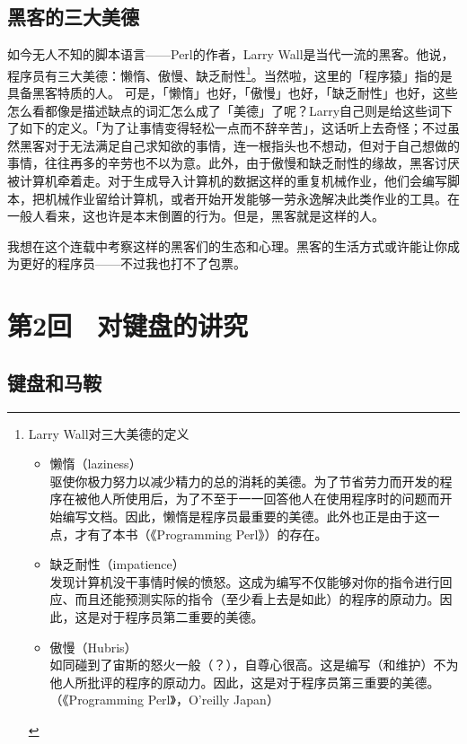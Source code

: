 \documentclass[a4paper,12pt]{article}
\begin{document}
\subsection{黑客的三大美德}
如今无人不知的脚本语言——Perl的作者，Larry Wall是当代一流的黑客。他说，程序员有三大美德：懒惰、傲慢、缺乏耐性\footnote{Larry Wall对三大美德的定义

\begin{itemize}
\item 懒惰（laziness）\\ 
驱使你极力努力以减少精力的总的消耗的美德。为了节省劳力而开发的程序在被他人所使用后，为了不至于一一回答他人在使用程序时的问题而开始编写文档。因此，懒惰是程序员最重要的美德。此外也正是由于这一点，才有了本书（《Programming Perl》）的存在。

\item 缺乏耐性（impatience）\\ 
发现计算机没干事情时候的愤怒。这成为编写不仅能够对你的指令进行回应、而且还能预测实际的指令（至少看上去是如此）的程序的原动力。因此，这是对于程序员第二重要的美德。

\item 傲慢（Hubris）\\ 
如同碰到了宙斯的怒火一般（？），自尊心很高。这是编写（和维护）不为他人所批评的程序的原动力。因此，这是对于程序员第三重要的美德。
（《Programming Perl》，O'reilly Japan）
\end{itemize}
}。当然啦，这里的「程序猿」指的是具备黑客特质的人。
可是，「懒惰」也好，「傲慢」也好，「缺乏耐性」也好，这些怎么看都像是描述缺点的词汇怎么成了「美德」了呢？Larry自己则是给这些词下了如下的定义。「为了让事情变得轻松一点而不辞辛苦」，这话听上去奇怪；不过虽然黑客对于无法满足自己求知欲的事情，连一根指头也不想动，但对于自己想做的事情，往往再多的辛劳也不以为意。此外，由于傲慢和缺乏耐性的缘故，黑客讨厌被计算机牵着走。对于生成导入计算机的数据这样的重复机械作业，他们会编写脚本，把机械作业留给计算机，或者开始开发能够一劳永逸解决此类作业的工具。在一般人看来，这也许是本末倒置的行为。但是，黑客就是这样的人。

我想在这个连载中考察这样的黑客们的生态和心理。黑客的生活方式或许能让你成为更好的程序员——不过我也打不了包票。


\section{第2回　对键盘的讲究}

\subsection{键盘和马鞍}
\end{document}
